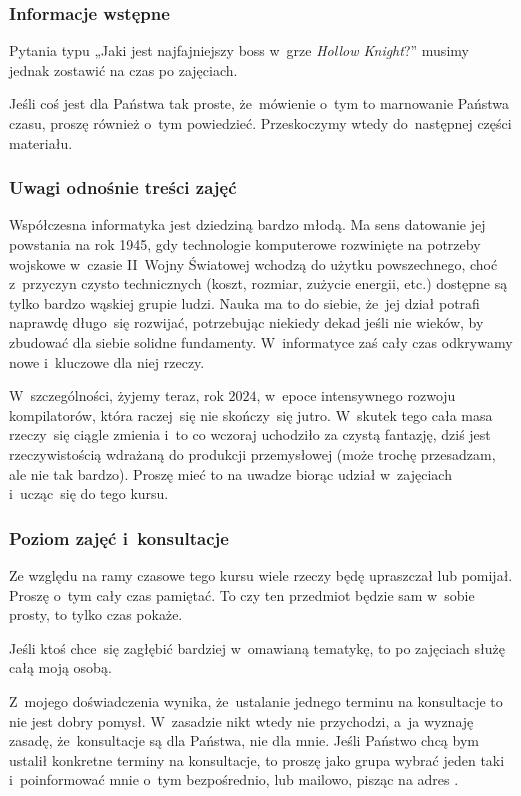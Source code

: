 \documentclass[10pt,t]{beamer}
\begin{document}
\begin{frame}
  \frametitle{Informacje wstępne}


  Pytania typu „Jaki jest najfajniejszy boss w~grze \textit{Hollow
    Knight}?” musimy jednak zostawić na czas po zajęciach.

  Jeśli coś jest dla Państwa tak proste, że~mówienie o~tym to marnowanie
  Państwa czasu, proszę również o~tym powiedzieć. Przeskoczymy wtedy
  do~następnej części materiału.

\end{frame}





\begin{frame}
  \frametitle{Uwagi odnośnie treści zajęć}


  Współczesna informatyka jest dziedziną bardzo młodą. Ma sens datowanie
  jej powstania na rok 1945, gdy technologie komputerowe rozwinięte na
  potrzeby wojskowe w~czasie II~Wojny Światowej wchodzą do użytku
  powszechnego, choć z~przyczyn czysto technicznych (koszt, rozmiar,
  zużycie energii, etc.) dostępne są tylko bardzo wąskiej
  grupie ludzi. Nauka ma to do siebie, że~jej dział potrafi naprawdę
  długo~się rozwijać, potrzebując niekiedy dekad jeśli nie wieków, by
  zbudować dla siebie solidne fundamenty. W~informatyce zaś cały czas
  odkrywamy nowe i~kluczowe dla niej rzeczy.

  W~szczególności, żyjemy teraz, rok $2024$, w~epoce intensywnego rozwoju
  kompilatorów, która raczej~się nie skończy~się jutro. W~skutek tego cała
  masa rzeczy~się ciągle zmienia i~to co wczoraj uchodziło za czystą
  fantazję, dziś jest rzeczywistością wdrażaną do produkcji przemysłowej
  (może trochę przesadzam, ale nie tak bardzo). Proszę mieć to na uwadze
  biorąc udział w~zajęciach i~ucząc~się do tego kursu.

\end{frame}





\begin{frame}
  \frametitle{Poziom zajęć i~konsultacje}


  Ze względu na ramy czasowe tego kursu wiele rzeczy będę
  \alert{upraszczał} lub \alert{pomijał}. Proszę o~tym cały czas pamiętać.
  To czy ten przedmiot będzie sam w~sobie \alert{prosty}, to tylko czas
  pokaże.

  Jeśli ktoś chce~się zagłębić bardziej w~omawianą tematykę, to po
  zajęciach służę całą moją osobą.

  Z~mojego doświadczenia wynika, że~ustalanie jednego terminu na konsultacje
  to nie jest dobry pomysł. W~zasadzie nikt wtedy nie przychodzi, a~ja
  wyznaję zasadę, że~konsultacje są dla Państwa, nie dla mnie. Jeśli
  Państwo chcą bym ustalił konkretne terminy na konsultacje, to proszę jako
  grupa wybrać jeden taki i~poinformować mnie o~tym bezpośrednio, lub
  mailowo, pisząc na adres \email.

\end{frame}
\end{document}
